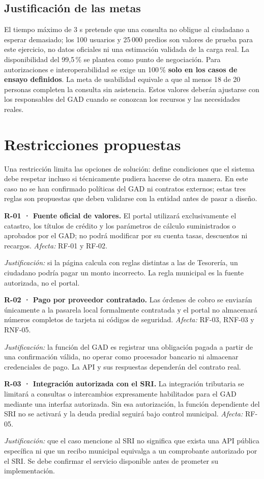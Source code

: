 \documentclass[10pt,onecolumn]{IEEEtran}
\newcommand{\rf}[2]{\par\smallskip\noindent\textbf{#1.} #2\par}
\begin{document}
\subsection{Justificación de las metas}
El tiempo máximo de 3 s pretende que una consulta no obligue al ciudadano a esperar demasiado; los 100 usuarios y 25\,000 predios son valores de prueba para este ejercicio, no datos oficiales ni una estimación validada de la carga real. La disponibilidad del 99,5\,\% se plantea como punto de negociación. Para autorizaciones e interoperabilidad se exige un 100\,\% \textbf{solo en los casos de ensayo definidos}. La meta de usabilidad equivale a que al menos 18 de 20 personas completen la consulta sin asistencia. Estos valores deberán ajustarse con los responsables del GAD cuando se conozcan los recursos y las necesidades reales.

\section{Restricciones propuestas}
Una restricción limita las opciones de solución: define condiciones que el sistema debe respetar incluso si técnicamente pudiera hacerse de otra manera. En este caso no se han confirmado políticas del GAD ni contratos externos; estas tres reglas son propuestas que deben validarse con la entidad antes de pasar a diseño.

\rf{R-01 · Fuente oficial de valores}{El portal utilizará exclusivamente el catastro, los títulos de crédito y los parámetros de cálculo suministrados o aprobados por el GAD; no podrá modificar por su cuenta tasas, descuentos ni recargos. \textit{Afecta:} RF-01 y RF-02.}
\noindent\textit{Justificación:} si la página calcula con reglas distintas a las de Tesorería, un ciudadano podría pagar un monto incorrecto. La regla municipal es la fuente autorizada, no el portal.\par

\rf{R-02 · Pago por proveedor contratado}{Las órdenes de cobro se enviarán únicamente a la pasarela local formalmente contratada y el portal no almacenará números completos de tarjeta ni códigos de seguridad. \textit{Afecta:} RF-03, RNF-03 y RNF-05.}
\noindent\textit{Justificación:} la función del GAD es registrar una obligación pagada a partir de una confirmación válida, no operar como procesador bancario ni almacenar credenciales de pago. La API y sus respuestas dependerán del contrato real.\par

\rf{R-03 · Integración autorizada con el SRI}{La integración tributaria se limitará a consultas o intercambios expresamente habilitados para el GAD mediante una interfaz autorizada. Sin esa autorización, la función dependiente del SRI no se activará y la deuda predial seguirá bajo control municipal. \textit{Afecta:} RF-05.}
\noindent\textit{Justificación:} que el caso mencione al SRI no significa que exista una API pública específica ni que un recibo municipal equivalga a un comprobante autorizado por el SRI. Se debe confirmar el servicio disponible antes de prometer su implementación.\par
\end{document}
